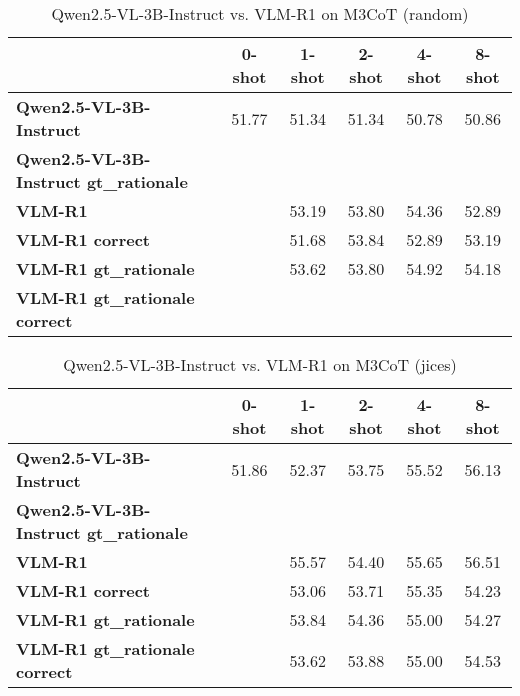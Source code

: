 \begin{table}
\caption{Qwen2.5-VL-3B-Instruct vs. VLM-R1 on M3CoT (random)}
\label{tab:Qwen2.5-VL-3B-Instruct_M3CoT_TRAIN_random}
\begin{tabular}{lccccc}
\toprule
 & 0-shot & 1-shot & 2-shot & 4-shot & 8-shot \\
\midrule
\textbf{Qwen2.5-VL-3B-Instruct} & 51.77 & 51.34 & 51.34 & 50.78 & 50.86 \\
\textbf{Qwen2.5-VL-3B-Instruct gt\_rationale} &  &  &  &  &  \\
\textbf{VLM-R1} &  & 53.19 & 53.80 & 54.36 & 52.89 \\
\textbf{VLM-R1 correct} &  & 51.68 & 53.84 & 52.89 & 53.19 \\
\textbf{VLM-R1 gt\_rationale} &  & 53.62 & 53.80 & 54.92 & 54.18 \\
\textbf{VLM-R1 gt\_rationale correct} &  &  &  &  &  \\
\bottomrule
\end{tabular}
\end{table}


\begin{table}
\caption{Qwen2.5-VL-3B-Instruct vs. VLM-R1 on M3CoT (jices)}
\label{tab:Qwen2.5-VL-3B-Instruct_M3CoT_TRAIN_jices}
\begin{tabular}{lccccc}
\toprule
 & 0-shot & 1-shot & 2-shot & 4-shot & 8-shot \\
\midrule
\textbf{Qwen2.5-VL-3B-Instruct} & 51.86 & 52.37 & 53.75 & 55.52 & 56.13 \\
\textbf{Qwen2.5-VL-3B-Instruct gt\_rationale} &  &  &  &  &  \\
\textbf{VLM-R1} &  & 55.57 & 54.40 & 55.65 & 56.51 \\
\textbf{VLM-R1 correct} &  & 53.06 & 53.71 & 55.35 & 54.23 \\
\textbf{VLM-R1 gt\_rationale} &  & 53.84 & 54.36 & 55.00 & 54.27 \\
\textbf{VLM-R1 gt\_rationale correct} &  & 53.62 & 53.88 & 55.00 & 54.53 \\
\bottomrule
\end{tabular}
\end{table}


